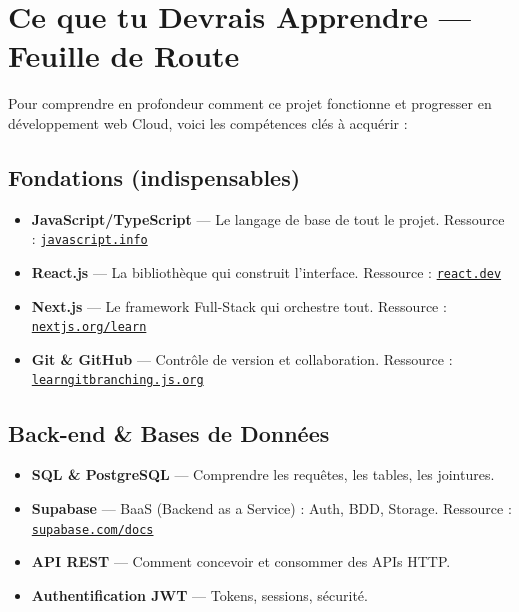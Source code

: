 \documentclass[12pt, a4paper]{article}
\begin{document}
\section{Ce que tu Devrais Apprendre — Feuille de Route}

Pour comprendre en profondeur comment ce projet fonctionne et progresser
en développement web Cloud, voici les compétences clés à acquérir :

\subsection{Fondations (indispensables)}

\begin{itemize}
  \item \textbf{JavaScript/TypeScript} — Le langage de base de tout le projet.
        Ressource : \href{https://javascript.info}{\texttt{javascript.info}}
  \item \textbf{React.js} — La bibliothèque qui construit l'interface.
        Ressource : \href{https://react.dev}{\texttt{react.dev}}
  \item \textbf{Next.js} — Le framework Full-Stack qui orchestre tout.
        Ressource : \href{https://nextjs.org/learn}{\texttt{nextjs.org/learn}}
  \item \textbf{Git \& GitHub} — Contrôle de version et collaboration.
        Ressource : \href{https://learngitbranching.js.org}{\texttt{learngitbranching.js.org}}
\end{itemize}

\subsection{Back-end \& Bases de Données}

\begin{itemize}
  \item \textbf{SQL \& PostgreSQL} — Comprendre les requêtes, les tables, les jointures.
  \item \textbf{Supabase} — BaaS (Backend as a Service) : Auth, BDD, Storage.
        Ressource : \href{https://supabase.com/docs}{\texttt{supabase.com/docs}}
  \item \textbf{API REST} — Comment concevoir et consommer des APIs HTTP.
  \item \textbf{Authentification JWT} — Tokens, sessions, sécurité.
\end{itemize}
\end{document}
